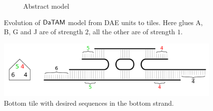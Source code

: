 \begin{figure}[H]
\begin{center}
\begin{subfigure}[b]{0.190\textwidth}
		\caption{Abstract model}
		\label{fig:abstract_model}
	\end{subfigure}
	\caption{Evolution of $\mathsf{DaTAM}$ model from DAE units to tiles. Here glues {\sf A}, {\sf B}, {\sf G} and {\sf J} are of strength $2$, all the other are of strength $1$.} %
	\label{fig:evolution}
\end{center}
\end{figure}

\begin{figure}[H]
\begin{center}
	\includegraphics[scale=0.75]{./figures/3-color/bottom_tile.pdf}
	\caption{Bottom tile with desired sequences in the bottom strand.}
	\label{fig:bottom_tile}
\end{center}
\end{figure}

